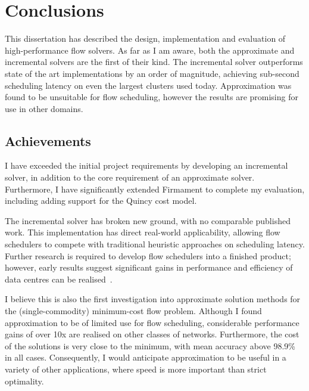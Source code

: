 \chapter{Conclusions}

This dissertation has described the design, implementation and evaluation of high-performance flow solvers. As far as I am aware, both the approximate and incremental solvers are the first of their kind. The incremental solver outperforms state of the art implementations by an order of magnitude, achieving sub-second scheduling latency on even the largest clusters used today. Approximation was found to be unsuitable for flow scheduling, however the results are promising for use in other domains.

\section{Achievements}

I have exceeded the initial project requirements by developing an incremental solver, in addition to the core requirement of an approximate solver. Furthermore, I have significantly extended Firmament to complete my evaluation, including adding support for the Quincy cost model.

The incremental solver has broken new ground, with no comparable published work. This implementation has direct real-world applicability, allowing flow schedulers to compete with traditional heuristic approaches on scheduling latency. Further research is required to develop flow schedulers into a finished product; however, early results suggest significant gains in performance and efficiency of data centres can be realised~\cite{Schwarzkopf:2015}.


I believe this is also the first investigation into approximate solution methods for the (single-commodity) minimum-cost flow problem. Although I found approximation to be of limited use for flow scheduling, considerable performance gains of over 10x are realised on other classes of networks. Furthermore, the cost of the solutions is very close to the minimum, with mean accuracy above 98.9\% in all cases. Consequently, I would anticipate approximation to be useful in a variety of other applications, where speed is more important than strict optimality.


